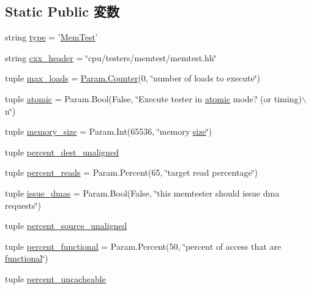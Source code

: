 \subsection*{Static Public 変数}
\begin{DoxyCompactItemize}
\item 
string \hyperlink{classMemTest_1_1MemTest_acce15679d830831b0bbe8ebc2a60b2ca}{type} = '\hyperlink{classMemTest_1_1MemTest}{MemTest}'
\item 
string \hyperlink{classMemTest_1_1MemTest_a17da7064bc5c518791f0c891eff05fda}{cxx\_\-header} = \char`\"{}cpu/testers/memtest/memtest.hh\char`\"{}
\item 
tuple \hyperlink{classMemTest_1_1MemTest_aeef53b9fe23d7e7579e1765b180b9a9e}{max\_\-loads} = \hyperlink{base_2types_8hh_ae1475755791765b8e6f6a8bb091e273e}{Param.Counter}(0, \char`\"{}number of loads to execute\char`\"{})
\item 
tuple \hyperlink{classMemTest_1_1MemTest_a3f21b1c4cb8442db410072b4c7d04f28}{atomic} = Param.Bool(False, \char`\"{}Execute tester in \hyperlink{classMemTest_1_1MemTest_a3f21b1c4cb8442db410072b4c7d04f28}{atomic} mode? (or timing)$\backslash$n\char`\"{})
\item 
tuple \hyperlink{classMemTest_1_1MemTest_a1cf2f09c6d685e8208dc29b8d059c7ae}{memory\_\-size} = Param.Int(65536, \char`\"{}memory \hyperlink{classMemTest_a245260f6f74972558f61b85227df5aae}{size}\char`\"{})
\item 
tuple \hyperlink{classMemTest_1_1MemTest_aec9cf691794f99291fb81c7d93400e5d}{percent\_\-dest\_\-unaligned}
\item 
tuple \hyperlink{classMemTest_1_1MemTest_a4973154d328ff1b1c957fe66c92a988e}{percent\_\-reads} = Param.Percent(65, \char`\"{}target read percentage\char`\"{})
\item 
tuple \hyperlink{classMemTest_1_1MemTest_a6e8b9de5c0d66c3f4782105ffd486363}{issue\_\-dmas} = Param.Bool(False, \char`\"{}this memtester should issue dma requests\char`\"{})
\item 
tuple \hyperlink{classMemTest_1_1MemTest_a143c80dade2755876d9bf20c20f98a9e}{percent\_\-source\_\-unaligned}
\item 
tuple \hyperlink{classMemTest_1_1MemTest_a9710758ce3bb6a6ec2b0aa194918399b}{percent\_\-functional} = Param.Percent(50, \char`\"{}percent of access that are \hyperlink{classMemTest_1_1MemTest_ac90470b0f2da07edf9757a1a904579b8}{functional}\char`\"{})
\item 
tuple \hyperlink{classMemTest_1_1MemTest_ab7e138795f276619ab01efe41b5e167c}{percent\_\-uncacheable}

\end{DoxyCompactItemize}
